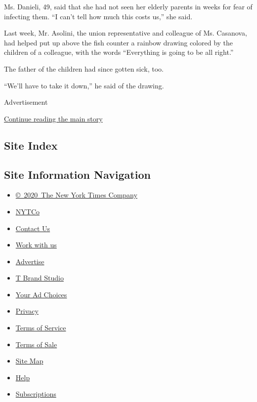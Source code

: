 Ms. Danieli, 49, said that she had not seen her elderly parents in weeks
for fear of infecting them. ``I can't tell how much this costs us,'' she
said.

Last week, Mr. Asolini, the union representative and colleague of Ms.
Casanova, had helped put up above the fish counter a rainbow drawing
colored by the children of a colleague, with the words ``Everything is
going to be all right.''

The father of the children had since gotten sick, too.

``We'll have to take it down,'' he said of the drawing.

Advertisement

\protect\hyperlink{after-bottom}{Continue reading the main story}

\hypertarget{site-index}{%
\subsection{Site Index}\label{site-index}}

\hypertarget{site-information-navigation}{%
\subsection{Site Information
Navigation}\label{site-information-navigation}}

\begin{itemize}
\tightlist
\item
  \href{https://help.nytimes3xbfgragh.onion/hc/en-us/articles/115014792127-Copyright-notice}{©~2020~The
  New York Times Company}
\end{itemize}

\begin{itemize}
\tightlist
\item
  \href{https://www.nytco.com/}{NYTCo}
\item
  \href{https://help.nytimes3xbfgragh.onion/hc/en-us/articles/115015385887-Contact-Us}{Contact
  Us}
\item
  \href{https://www.nytco.com/careers/}{Work with us}
\item
  \href{https://nytmediakit.com/}{Advertise}
\item
  \href{http://www.tbrandstudio.com/}{T Brand Studio}
\item
  \href{https://www.nytimes3xbfgragh.onion/privacy/cookie-policy\#how-do-i-manage-trackers}{Your
  Ad Choices}
\item
  \href{https://www.nytimes3xbfgragh.onion/privacy}{Privacy}
\item
  \href{https://help.nytimes3xbfgragh.onion/hc/en-us/articles/115014893428-Terms-of-service}{Terms
  of Service}
\item
  \href{https://help.nytimes3xbfgragh.onion/hc/en-us/articles/115014893968-Terms-of-sale}{Terms
  of Sale}
\item
  \href{https://spiderbites.nytimes3xbfgragh.onion}{Site Map}
\item
  \href{https://help.nytimes3xbfgragh.onion/hc/en-us}{Help}
\item
  \href{https://www.nytimes3xbfgragh.onion/subscription?campaignId=37WXW}{Subscriptions}
\end{itemize}
